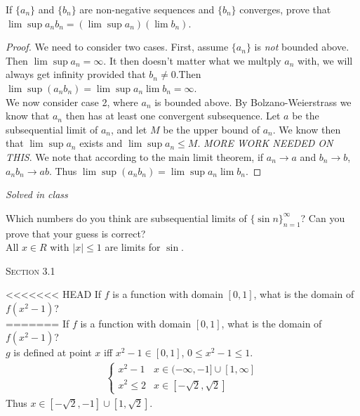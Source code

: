 \documentclass[12pt]{article}
\newenvironment{exercise}[2][Exercise]{\begin{trivlist}
\item[\hskip \labelsep {\bfseries #1}\hskip \labelsep {\bfseries #2.}]}{\end{trivlist}}
\begin{document}
\begin{exercise}{2.6.8}
If $\{a_n\}$ and $\{b_n\}$ are non-negative sequences and $\{b_n\}$ converges, prove that $\lim \sup a_n b_n= (\lim \sup a_n) (\lim b_n)$.

	\begin{proof}
	We need to consider two cases. First, assume $\{a_n\}$ is \emph{not} bounded above. Then $\lim \sup a_n  = \infty$. It then doesn't matter what we multply $a_n$ with, we will always get infinity provided that $b_n \neq 0$.Then $\lim \sup (a_n b_n) = \lim \sup a_n \lim b_n = \infty$. \\
	We now consider case 2, where $a_n$ is bounded above. By Bolzano-Weierstrass we know that $a_n$ then has at least one convergent subsequence. Let $a$ be the subsequential limit of $a_n$, and let $M$ be the upper bound of $a_n$. We know then that $\lim \sup a_n$ exists and $\lim \sup a_n \leq M$. \emph{MORE WORK NEEDED ON THIS}. We note that according to the main limit theorem, if $a_n \to a$ and $b_n \to b$, $a_n b_n \to a b$. Thus $\lim \sup (a_n b_n) = \lim \sup a_n \lim b_n$.
	\end{proof}
\end{exercise}


\begin{exercise}{2.6.9}
\emph{Solved in class}
\end{exercise}


\begin{exercise}{2.6.12}
Which numbers do you think are subsequential limits of $\{ \sin n\}_{n=1}^\infty$? Can you prove that your guess is correct? \\

All $x \in R$ with $|x| \leq 1$ are limits for $\sin$.
\end{exercise}




\begin{center}
\textsc{\Large Section 3.1}
\end{center}

\begin{exercise}{3.1.1}
<<<<<<< HEAD
If $f$ is a function with domain $[0,1]$, what is the domain of $f(x^2-1)$?\\
=======
    If $f$ is a function with domain $[0,1]$, what is the domain of $f(x^2 -1)$? \\
    
    $g$ is defined at point $x$ iff $x^2-1 \in [0,1]$, $0 \leq x^2-1 \leq 1$.
    \begin{align*}
        \begin{cases}
            x^2-1 & x\in (-\infty,-1] \cup [1,\infty] \\
            x^2 \leq 2 & x \in [-\sqrt{2},\sqrt{2}]
         \end{cases}
    \end{align*}
    Thus $x \in [-\sqrt{2},-1] \cup [1,\sqrt{2}]$.
\end{exercise}
\end{document}
